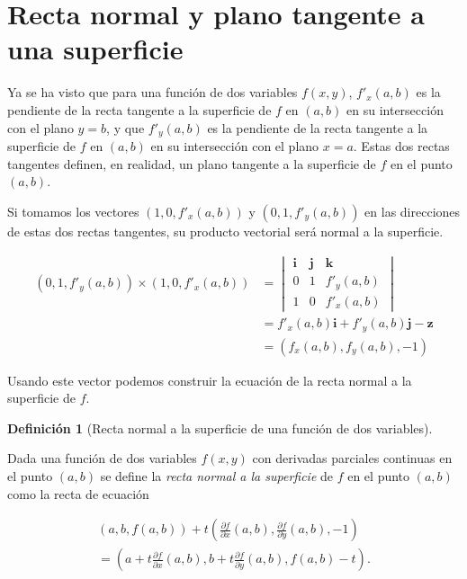 \documentclass[
  a4paper,
]{scrreport}
\theoremstyle{plain}
\theoremstyle{plain}
\theoremstyle{definition}
\newtheorem{definition}{Definición}[chapter]
\theoremstyle{definition}
\theoremstyle{plain}
\theoremstyle{definition}
\theoremstyle{remark}
\begin{document}
\hypertarget{recta-normal-y-plano-tangente-a-una-superficie}{%
\section{Recta normal y plano tangente a una
superficie}\label{recta-normal-y-plano-tangente-a-una-superficie}}

Ya se ha visto que para una función de dos variables \(f(x,y)\),
\(f'_{x}(a,b)\) es la pendiente de la recta tangente a la superficie de
\(f\) en \((a,b)\) en su intersección con el plano \(y=b\), y que
\(f'_y(a,b)\) es la pendiente de la recta tangente a la superficie de
\(f\) en \((a,b)\) en su intersección con el plano \(x=a\). Estas dos
rectas tangentes definen, en realidad, un plano tangente a la superficie
de \(f\) en el punto \((a,b)\).

Si tomamos los vectores \((1, 0, f'_x(a,b))\) y \((0, 1, f'_y(a,b))\) en
las direcciones de estas dos rectas tangentes, su producto vectorial
será normal a la superficie.

\begin{align*}
(0, 1, f'_y(a,b)) \times (1, 0, f'_x(a,b))
&= 
\begin{vmatrix}
\mathbf{i} & \mathbf{j} & \mathbf{k} \\
0 & 1 & f'_y(a,b) \\
1 & 0 & f'_x(a,b) 
\end{vmatrix} \\
&= f'_x(a,b) \mathbf{i} + f'_y(a,b) \mathbf{j} - \mathbf{z} \\
&= (f_x(a,b), f_y(a,b), -1)
\end{align*}

Usando este vector podemos construir la ecuación de la recta normal a la
superficie de \(f\).

\begin{definition}[Recta normal a la superficie de una función de dos
variables]\protect\hypertarget{def-recta-normal-superficie}{}\label{def-recta-normal-superficie}

Dada una función de dos variables \(f(x,y)\) con derivadas parciales
continuas en el punto \((a,b)\) se define la \emph{recta normal a la
superficie} de \(f\) en el punto \((a,b)\) como la recta de ecuación

\[
\begin{gathered}
(a, b, f(a,b)) + t \left(\frac{\partial f}{\partial x}(a,b), \frac{\partial f}{\partial y}(a,b), -1\right) \\
= \left(a+t\frac{\partial f}{\partial x}(a,b), b+t\frac{\partial f}{\partial y}(a,b), f(a,b)-t\right).
\end{gathered}
\]

\end{definition}
\end{document}
